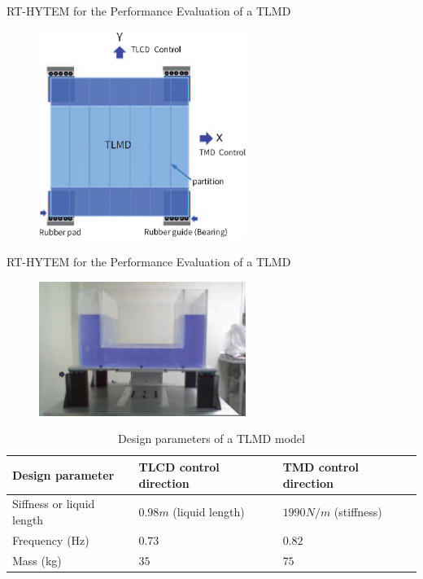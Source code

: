 \documentclass[usepdftitle=false]{beamer}
\newcommand\Fontvi{\fontsize{6}{7.2}\selectfont}
\begin{document}
\begin{frame}{RT-HYTEM for the Performance Evaluation of a TLMD}
\begin{figure}[ht]
\centering
\includegraphics[width=0.6\textwidth] {figure/5-1.eps}
\label{fig:5-1}
\end{figure}
\end{frame}

\begin{frame}{RT-HYTEM for the Performance Evaluation of a TLMD}
\begin{figure}[ht]
\centering
\includegraphics[width=0.6\textwidth] {figure/5-2.eps}
\label{fig:5-2}
\end{figure}
\Fontvi
\begin{table}[ht]
\centering
\begin{tabularx}{\textwidth}{@{}X|X|X@{}}
\toprule[1pt]\midrule[0.3pt]
Design parameter & TLCD control direction & TMD control direction\\ \hline
Siffness or liquid length & $0.98m$ (liquid length) & $1990N/m$ (stiffness)\\
Frequency (Hz) & $0.73$ & $0.82$\\
Mass (kg) & $35$ & $75$\\
\bottomrule
\end{tabularx}
\caption{Design parameters of a TLMD model}
\label{tab:5-3}
\end{table}
\end{frame}
\end{document}
